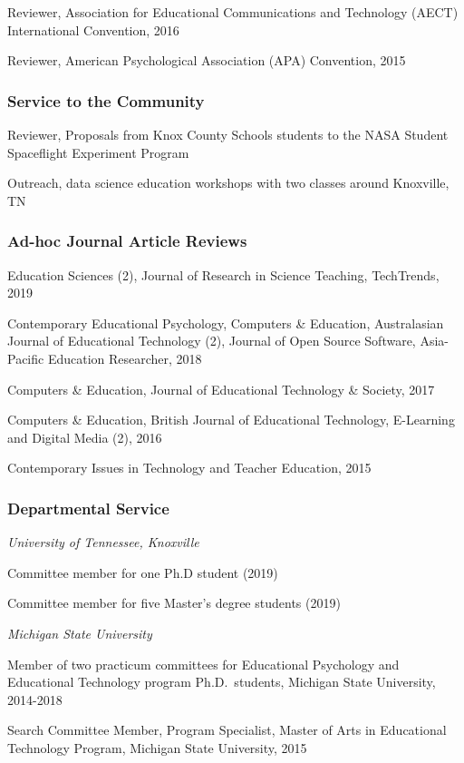 \documentclass[14,]{article}
\begin{document}
Reviewer, Association for Educational Communications and Technology
(AECT) International Convention, 2016

Reviewer, American Psychological Association (APA) Convention, 2015

\subsubsection{Service to the Community}\label{service-to-the-community}

Reviewer, Proposals from Knox County Schools students to the NASA
Student Spaceflight Experiment Program

Outreach, data science education workshops with two classes around
Knoxville, TN

\subsubsection{Ad-hoc Journal Article
Reviews}\label{ad-hoc-journal-article-reviews}

Education Sciences (2), Journal of Research in Science Teaching,
TechTrends, 2019

Contemporary Educational Psychology, Computers \& Education,
Australasian Journal of Educational Technology (2), Journal of Open
Source Software, Asia-Pacific Education Researcher, 2018

Computers \& Education, Journal of Educational Technology \& Society,
2017

Computers \& Education, British Journal of Educational Technology,
E-Learning and Digital Media (2), 2016

Contemporary Issues in Technology and Teacher Education, 2015

\subsubsection{Departmental Service}\label{departmental-service}

\emph{University of Tennessee, Knoxville}

Committee member for one Ph.D student (2019)

Committee member for five Master's degree students (2019)

\emph{Michigan State University}

Member of two practicum committees for Educational Psychology and
Educational Technology program Ph.D.~students, Michigan State
University, 2014-2018

Search Committee Member, Program Specialist, Master of Arts in
Educational Technology Program, Michigan State University, 2015
\end{document}
